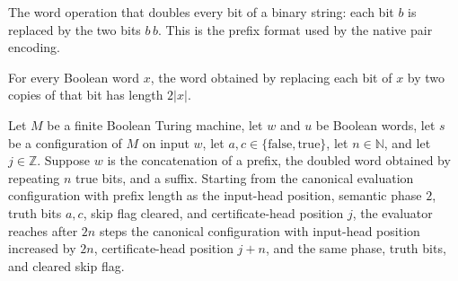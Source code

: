 \begin{definition}
\label{Complexity.satBits}
\leanok
The word operation that doubles every bit of a binary string: each bit $b$ is
replaced by the two bits $b\,b$. This is the prefix format used by the native pair
encoding.
\end{definition}

\begin{lemma}
\label{Complexity.satBits_length}
\leanok
{}
For every Boolean word $x$, the word obtained by replacing each bit of $x$ by two copies
of that bit has length $2|x|$.
\end{lemma}

\begin{lemma}
\label{Complexity.satEval_index}
\leanok
{}
Let $M$ be a finite Boolean Turing machine, let $w$ and $u$ be Boolean words, let $s$ be
a configuration of $M$ on input $w$, let $a,c\in\{\mathrm{false},\mathrm{true}\}$, let
$n\in\mathbb N$, and let $j\in\mathbb Z$. Suppose $w$ is the concatenation of a prefix,
the doubled word obtained by repeating $n$ true bits, and a suffix. Starting from the
canonical evaluation configuration with prefix length as the input-head position,
semantic phase $2$, truth bits $a,c$, skip flag cleared, and certificate-head position
$j$, the evaluator reaches after $2n$ steps the canonical configuration with input-head
position increased by $2n$, certificate-head position $j+n$, and the same phase, truth
bits, and cleared skip flag.
\end{lemma}

